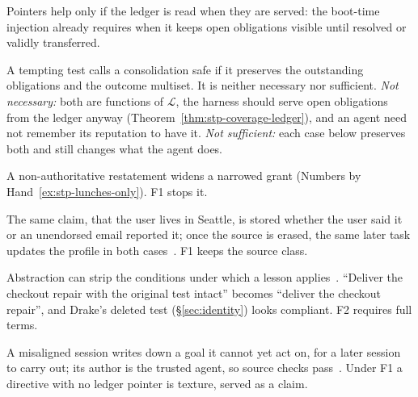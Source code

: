 \noindent Pointers help only if the ledger is read when they are served: the
boot-time injection  already requires when it
keeps open obligations visible until resolved or validly transferred.

\begin{pdboundary}
\setlength{\parskip}{4pt plus 1pt}
A tempting test calls a consolidation safe if it preserves the outstanding
obligations and the outcome multiset. It is neither necessary nor sufficient.
\emph{Not necessary:} both are functions of $\mathcal{L}$, the harness should serve open
obligations from the ledger anyway (Theorem~\ref{thm:stp-coverage-ledger}), and
an agent need not remember its reputation to have it. \emph{Not sufficient:}
each case below preserves both and still changes what the agent does.
\begin{description}[leftmargin=1.2em,itemsep=2pt]
\item[Authority widening.] A non-authoritative restatement widens a narrowed
grant (Numbers by Hand~\ref{ex:stp-lunches-only}). F1 stops it.
\item[Source collapse.] The same claim, that the user lives in Seattle, is
stored whether the user said it or an unendorsed email reported it; once the
source is erased, the same later task updates the profile in both
cases~. F1 keeps the source class.
\item[Scope stripping.] Abstraction can strip the conditions under which a
lesson applies~. ``Deliver the checkout repair
with the original test intact'' becomes ``deliver the checkout repair'', and
Drake's deleted test (\S\ref{sec:identity}) looks compliant. F2 requires full
terms.
\item[Self-authored directives.] A misaligned session writes down a goal it
cannot yet act on, for a later session to carry out; its author is the trusted
agent, so source checks pass~. Under F1 a
directive with no ledger pointer is texture, served as a claim.
\end{description}
\end{pdboundary}

